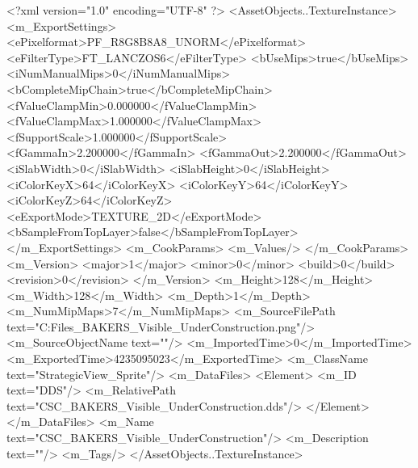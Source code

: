 <?xml version="1.0" encoding="UTF-8" ?>
<AssetObjects..TextureInstance>
	<m_ExportSettings>
		<ePixelformat>PF_R8G8B8A8_UNORM</ePixelformat>
		<eFilterType>FT_LANCZOS6</eFilterType>
		<bUseMips>true</bUseMips>
		<iNumManualMips>0</iNumManualMips>
		<bCompleteMipChain>true</bCompleteMipChain>
		<fValueClampMin>0.000000</fValueClampMin>
		<fValueClampMax>1.000000</fValueClampMax>
		<fSupportScale>1.000000</fSupportScale>
		<fGammaIn>2.200000</fGammaIn>
		<fGammaOut>2.200000</fGammaOut>
		<iSlabWidth>0</iSlabWidth>
		<iSlabHeight>0</iSlabHeight>
		<iColorKeyX>64</iColorKeyX>
		<iColorKeyY>64</iColorKeyY>
		<iColorKeyZ>64</iColorKeyZ>
		<eExportMode>TEXTURE_2D</eExportMode>
		<bSampleFromTopLayer>false</bSampleFromTopLayer>
	</m_ExportSettings>
	<m_CookParams>
		<m_Values/>
	</m_CookParams>
	<m_Version>
		<major>1</major>
		<minor>0</minor>
		<build>0</build>
		<revision>0</revision>
	</m_Version>
	<m_Height>128</m_Height>
	<m_Width>128</m_Width>
	<m_Depth>1</m_Depth>
	<m_NumMipMaps>7</m_NumMipMaps>
	<m_SourceFilePath text="C:\Users\Shadow\Desktop\Working Files\Icons\StrategicView\CSC_BAKERS_Visible_UnderConstruction.png"/>
	<m_SourceObjectName text=""/>
	<m_ImportedTime>0</m_ImportedTime>
	<m_ExportedTime>4235095023</m_ExportedTime>
	<m_ClassName text="StrategicView_Sprite"/>
	<m_DataFiles>
		<Element>
			<m_ID text="DDS"/>
			<m_RelativePath text="CSC_BAKERS_Visible_UnderConstruction.dds"/>
		</Element>
	</m_DataFiles>
	<m_Name text="CSC_BAKERS_Visible_UnderConstruction"/>
	<m_Description text=""/>
	<m_Tags/>
</AssetObjects..TextureInstance>

